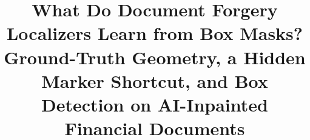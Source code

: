 \documentclass[conference]{IEEEtran}
\begin{document}
\title{What Do Document Forgery Localizers Learn from Box Masks?\\Ground-Truth Geometry, a Hidden Marker Shortcut, and Box Detection on AI-Inpainted Financial Documents}

\author{
}

\maketitle













\end{document}
